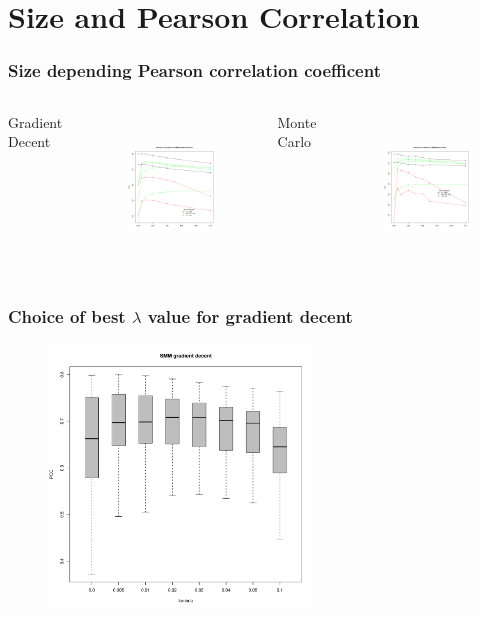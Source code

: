 \documentclass[presentation]{beamer}   %
\begin{document}
\section{Size and Pearson Correlation}
\begin{frame}
  \frametitle{Size depending Pearson correlation coefficent}
  \begin{columns}[t] %
		\centering Gradient Decent
		\begin{figure}
		\centering
			\includegraphics[width=40mm,height=40mm]{fig/smm_l005_ppc_size.pdf}
		\end{figure}
		\centering Monte Carlo
		\begin{figure}
			\centering
			\includegraphics[width=40mm,height=40mm]{fig/smm_mc_l005_ppc_size.pdf}
		\end{figure}
  \end{columns}
\end{frame}

\begin{frame}
  \frametitle{Choice of best $\lambda$ value for gradient decent}
	\begin{figure}
	\centering
		\includegraphics[width=70mm,height=70mm]{fig/choice_lambda.pdf}
	\end{figure}
\end{frame}
\end{document}
